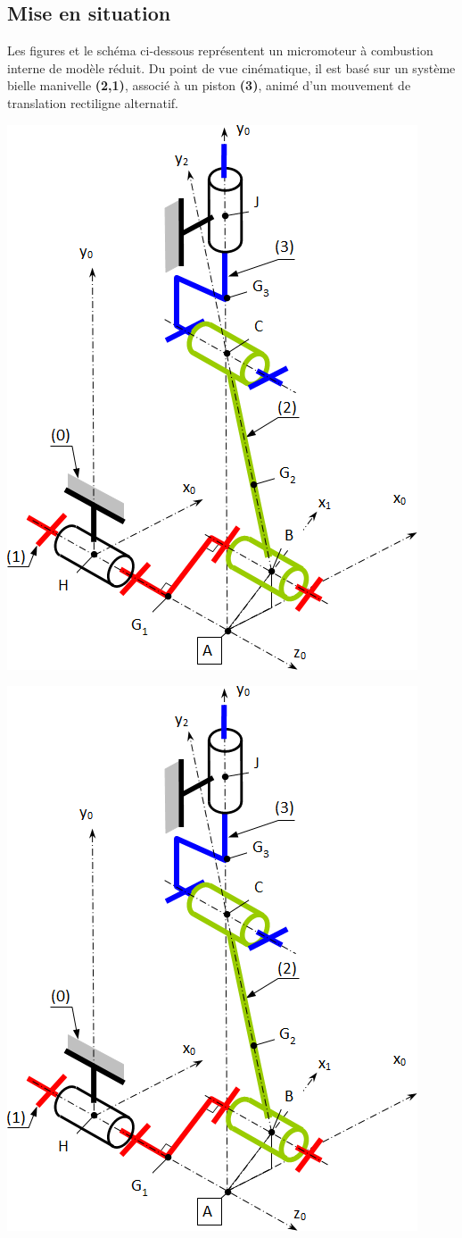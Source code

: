 \documentclass[10pt,fleqn]{article} %
\begin{document}
\def\pathfig{images}

\vspace{5cm}
\pagestyle{fancy}
\thispagestyle{plain}

\def\columnseprulecolor{\color{ocre}}
\setlength{\columnseprule}{0.4pt} 

\def\pathfig{images}

\ifprof
\else
\begin{multicols}{2}
\fi

\subsection*{Mise en situation}
Les figures et le schéma ci-dessous représentent un micromoteur à combustion interne de modèle réduit. Du point de vue cinématique, il est basé sur un système bielle manivelle \textbf{(2,1)}, associé à un piston \textbf{(3)}, animé d’un mouvement de translation rectiligne alternatif. 
\ifprof
\begin{center}
\includegraphics[width=.4\linewidth]{images/fig_02}
\end{center}
\else
\begin{center}
\includegraphics[width=.8\linewidth]{images/fig_02}

\end{center}
\end{multicols}
\end{document}
